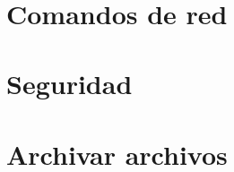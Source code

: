 \begin{frame}[c]{}
\end{frame}

\begin{frame}[fragile]
  \frametitle{}

  \begin{lstlisting}[language=Bash]
  \end{lstlisting}
\end{frame}

\section{Comandos de red}
\section{Seguridad}
\section{Archivar archivos}

